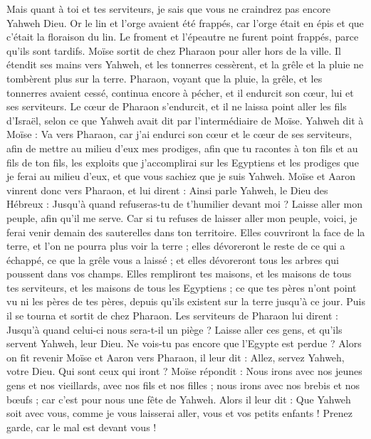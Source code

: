 \begin{multicols}{2}
Mais quant à toi et tes serviteurs, je sais que vous ne craindrez pas encore Yahweh Dieu.
Or le lin et l'orge avaient été frappés, car l'orge était en épis et que c’était la floraison du lin.
Le froment et l'épeautre ne furent point frappés, parce qu'ils sont tardifs.
Moïse sortit de chez Pharaon pour aller hors de la ville. Il étendit ses mains vers Yahweh, et les tonnerres cessèrent, et la grêle et la pluie ne tombèrent plus sur la terre.
Pharaon, voyant que la pluie, la grêle, et les tonnerres avaient cessé, continua encore à pécher, et il endurcit son cœur, lui et ses serviteurs.
Le cœur de Pharaon s'endurcit, et il ne laissa point aller les fils d'Israël, selon ce que Yahweh avait dit par l’intermédiaire de Moïse.
\VerseOne{}Yahweh dit à Moïse : Va vers Pharaon, car j'ai endurci son cœur et le cœur de ses serviteurs, afin de mettre au milieu d'eux mes prodiges,
afin que tu racontes à ton fils et au fils de ton fils, les exploits que j’accomplirai sur les Egyptiens et les prodiges que je ferai au milieu d'eux, et que vous sachiez que je suis Yahweh.
Moïse et Aaron vinrent donc vers Pharaon, et lui dirent : Ainsi parle Yahweh, le Dieu des Hébreux : Jusqu'à quand refuseras-tu de t'humilier devant moi ? Laisse aller mon peuple, afin qu'il me serve.
Car si tu refuses de laisser aller mon peuple, voici, je ferai venir demain des sauterelles dans ton territoire.
Elles couvriront la face de la terre, et l'on ne pourra plus voir la terre ; elles dévoreront le reste de ce qui a échappé, ce que la grêle vous a laissé ; et elles dévoreront tous les arbres qui poussent dans vos champs.
Elles rempliront tes maisons, et les maisons de tous tes serviteurs, et les maisons de tous les Egyptiens ; ce que tes pères n'ont point vu ni les pères de tes pères, depuis qu’ils existent sur la terre jusqu'à ce jour. Puis il se tourna et sortit de chez Pharaon.
Les serviteurs de Pharaon lui dirent : Jusqu'à quand celui-ci nous sera-t-il un piège ? Laisse aller ces gens, et qu'ils servent Yahweh, leur Dieu. Ne vois-tu pas encore que l'Egypte est perdue ?
Alors on fit revenir Moïse et Aaron vers Pharaon, il leur dit : Allez, servez Yahweh, votre Dieu. Qui sont ceux qui iront ?
Moïse répondit : Nous irons avec nos jeunes gens et nos vieillards, avec nos fils et nos filles ; nous irons avec nos brebis et nos bœufs ; car c'est pour nous une fête de Yahweh.
Alors il leur dit : Que Yahweh soit avec vous, comme je vous laisserai aller, vous et vos petits enfants ! Prenez garde, car le mal est devant vous !

\end{multicols}
